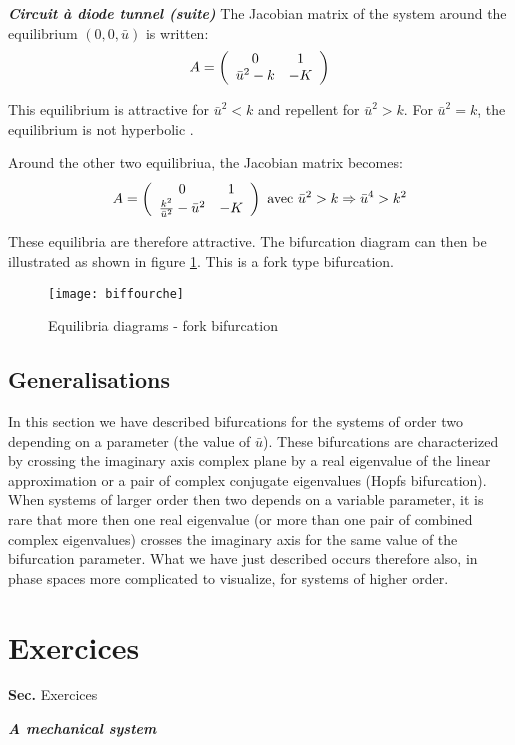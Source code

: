 {\begin{exemple}{\bf \em Circuit {à} diode tunnel (suite)}
The Jacobian matrix of the system around the equilibrium $(0,0, \bar u)$
is written:
$$
A = \bma{cc}0 & 1\\ \bar u^2-k & -K
\ema
$$

This equilibrium is attractive for $\bar u^2 < k$ and repellent for $\bar u^2>k$. For $\bar u^2
= k$, the equilibrium is not hyperbolic .

Around the other two equilibriua, the Jacobian matrix becomes: 
$$
A = \bma{cc} 0 & 1\\ \frac{k^2}{\bar u^2} -\bar u^2 & -K \ema \mbox{ avec } \bar u^2 > k
\Rightarrow \bar u^4 > k^2
$$

These equilibria are therefore attractive. The bifurcation diagram can then
be illustrated as shown in figure \ref{fig:biffourche}. This is a fork type bifurcation.

\begin{figure}[htbp] 
   \centering
   \texttt{[image: biffourche]} 
   \caption{Equilibria diagrams - fork bifurcation}
   \label{fig:biffourche}
\end{figure}
 
\subsection{Generalisations}

In this section we have described bifurcations
for the systems of order two depending on a parameter (the value of $\bar u$). 
These bifurcations are characterized by crossing the imaginary axis
complex plane by a real eigenvalue of the linear approximation or a
pair of complex conjugate eigenvalues (Hopfs bifurcation). When
systems of larger order then two depends on a variable parameter, it is rare
that more then one real eigenvalue (or more than one pair of combined complex eigenvalues) 
crosses the imaginary axis for the same value of the bifurcation parameter. 
What we have just described occurs therefore also, in phase spaces
more complicated to visualize, for systems of higher order.

\newpage
\section{Exercices}
{{\bf Sec. \thesection}\hfill Exercices
\hspace*{5mm}}
 
\begin{exercice} {\bf \em A mechanical system}


\end{exercice}
\end{exemple}}
